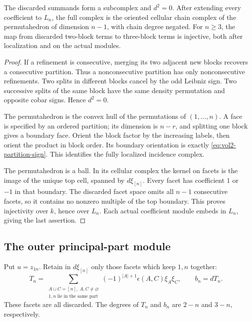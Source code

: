 \begin{lemma}\label{lem:vol2-partition-complex}
The discarded summands form a subcomplex and $d^2=0$.
After extending every coefficient to $L_n$, the full complex is
the oriented cellular chain complex of the permutahedron of
dimension $n-1$, with chain degree negated. For $n\geq3$, the
map from discarded two-block terms to three-block terms is
injective, both after localization and on the actual modules.
\end{lemma}

\begin{proof}
If a refinement is consecutive, merging its two adjacent new
blocks recovers a consecutive partition. Thus a nonconsecutive
partition has only nonconsecutive refinements. Two splits in
different blocks cancel by the odd Leibniz sign. Two successive
splits of the same block have the same density permutation and
opposite cobar signs. Hence $d^2=0$.

The permutahedron is the convex hull of the permutations of
$(1,\ldots,n)$. A face is specified by an ordered partition;
its dimension is $n-r$, and splitting one block gives a boundary
face. Orient the block factor by the increasing labels, then
orient the product in block order. Its boundary orientation is
exactly \eqref{eq:vol2-partition-sign}. This identifies the
fully localized incidence complex.

The permutahedron is a ball. In its cellular complex the kernel
on facets is the image of the unique top cell, spanned by
$d\xi_{[n]}$. Every facet has coefficient $1$ or $-1$ in that
boundary. The discarded facet space omits all $n-1$ consecutive
facets, so it contains no nonzero multiple of the top boundary.
This proves injectivity over $k$, hence over $L_n$. Each actual
coefficient module embeds in $L_n$, giving the last assertion.
\end{proof}

\subsection{The outer principal-part module}

Put $u=z_{1n}$. Retain in $d\xi_{[n]}$ only those facets which
keep $1,n$ together:
\begin{equation}\label{eq:vol2-outer-numerator}
 T_n=\sum_{\substack{A\sqcup C=[n],\ A,C\ne\varnothing\\
                        1,n\text{ lie in the same part}}}
          (-1)^{|A|+1}\epsilon(A,C)\xi_A\xi_C,
 \qquad b_n=dT_n.
\end{equation}
These facets are all discarded. The degrees of $T_n$ and $b_n$
are $2-n$ and $3-n$, respectively.

